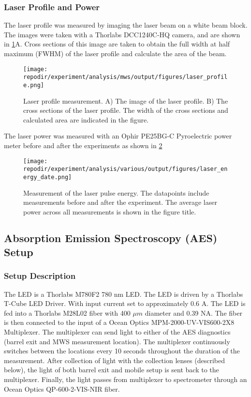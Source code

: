 \clearpage
\subsubsection{Laser Profile and Power}

The laser profile was measured by imaging the laser beam on a white beam block. The images were taken with a Thorlabs DCC1240C-HQ camera, and are shown in \ref{fig:SI_Laser_Profile}A. Cross sections of this image are taken to obtain the full width at half maximum (FWHM) of the laser profile and calculate the area of the beam.  

\begin{figure}[H]
\centering
\texttt{[image: \\repodir/experiment/analysis/mws/output/figures/laser\_profile.png]}
\caption{Laser profile measurement. A) The image of the laser profile. B) The cross sections of the laser profile. The width of the cross sections and calculated area are indicated in the figure.}
\label{fig:SI_Laser_Profile}
\end{figure}

The laser power was measured with an Ophir PE25BG-C Pyroelectric power meter before and after the experiments as shown in \ref{fig:SI_Laser_Energy} 



\begin{figure}[H]
\centering
\texttt{[image: \\repodir/experiment/analysis/various/output/figures/laser\_energy\_date.png]}
\caption{Measurement of the laser pulse energy. The datapoints include measurements before and after the experiment. The average laser power across all measurements is shown in the figure title. }
\label{fig:SI_Laser_Energy}
\end{figure}


\clearpage
\subsection{Absorption Emission Spectroscopy (AES) Setup}

\subsubsection{Setup Description}

The LED is a Thorlabs M780F2 780 nm LED. The LED is driven by a Thorlabs T-Cube LED Driver. With input current set to approximately 0.6 A. The LED is fed into a Thorlabs M28L02 fiber with 400 $\mu m$ diameter and 0.39 NA. The fiber is then connected to the input of a  Ocean Optics MPM-2000-UV-VIS600-2X8 Multiplexer.  The multiplexer can send light to either of the AES diagnostics (barrel exit and MWS measurement location). The multiplexer continuously switches between the locations every 10 seconds throughout the duration of the measurement. After collection of light with the collection lenses (described below), the light of both barrel exit and mobile setup is sent back to the multiplexer. Finally, the light passes from multiplexer to spectrometer through an Ocean Optics QP-600-2-VIS-NIR fiber.

